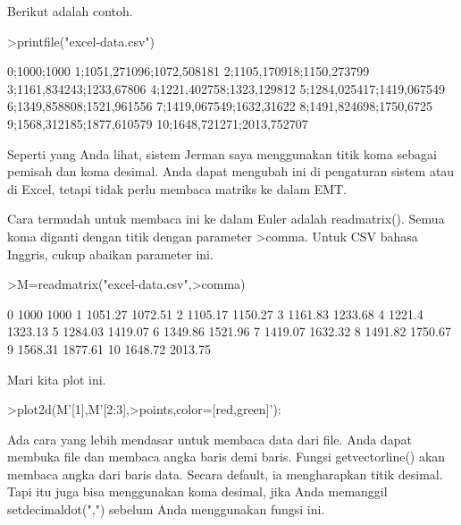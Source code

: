 \documentclass{article}
\begin{document}
\begin{eulernotebook}
\begin{eulercomment}
\begin{eulercomment}
\begin{eulercomment}
Berikut adalah contoh.
\end{eulercomment}
\begin{eulerprompt}
>printfile("excel-data.csv")
\end{eulerprompt}
\begin{euleroutput}
  0;1000;1000
  1;1051,271096;1072,508181
  2;1105,170918;1150,273799
  3;1161,834243;1233,67806
  4;1221,402758;1323,129812
  5;1284,025417;1419,067549
  6;1349,858808;1521,961556
  7;1419,067549;1632,31622
  8;1491,824698;1750,6725
  9;1568,312185;1877,610579
  10;1648,721271;2013,752707
\end{euleroutput}
\begin{eulercomment}
Seperti yang Anda lihat, sistem Jerman saya menggunakan titik koma
sebagai pemisah dan koma desimal. Anda dapat mengubah ini di
pengaturan sistem atau di Excel, tetapi tidak perlu membaca matriks ke
dalam EMT.

Cara termudah untuk membaca ini ke dalam Euler adalah readmatrix().
Semua koma diganti dengan titik dengan parameter \textgreater{}comma. Untuk CSV
bahasa Inggris, cukup abaikan parameter ini.
\end{eulercomment}
\begin{eulerprompt}
>M=readmatrix("excel-data.csv",>comma)
\end{eulerprompt}
\begin{euleroutput}
              0          1000          1000 
              1       1051.27       1072.51 
              2       1105.17       1150.27 
              3       1161.83       1233.68 
              4        1221.4       1323.13 
              5       1284.03       1419.07 
              6       1349.86       1521.96 
              7       1419.07       1632.32 
              8       1491.82       1750.67 
              9       1568.31       1877.61 
             10       1648.72       2013.75 
\end{euleroutput}
\begin{eulercomment}
Mari kita plot ini.
\end{eulercomment}
\begin{eulerprompt}
>plot2d(M'[1],M'[2:3],>points,color=[red,green]'):
\end{eulerprompt}
\begin{eulercomment}
Ada cara yang lebih mendasar untuk membaca data dari file. Anda dapat
membuka file dan membaca angka baris demi baris. Fungsi
getvectorline() akan membaca angka dari baris data. Secara default, ia
mengharapkan titik desimal. Tapi itu juga bisa menggunakan koma
desimal, jika Anda memanggil setdecimaldot(",") sebelum Anda
menggunakan fungsi ini.


\end{eulercomment}
\end{eulercomment}
\end{eulercomment}
\end{eulernotebook}
\end{document}
